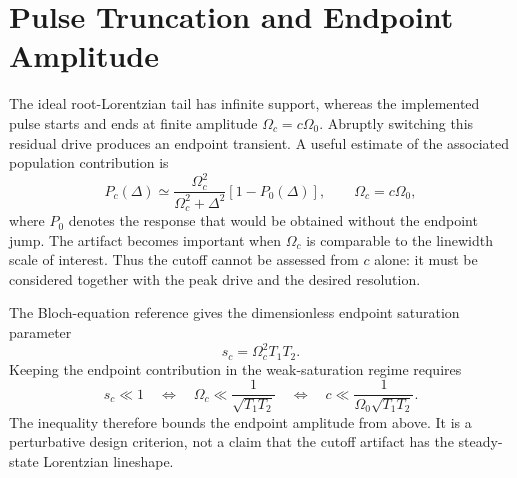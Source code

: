 \section{Pulse Truncation and Endpoint Amplitude}
\label{sec:pulse-cutoff}

The ideal root-Lorentzian tail has infinite support, whereas the implemented pulse
starts and ends at finite amplitude $\Omega_c=c\Omega_0$.  Abruptly switching
this residual drive produces an endpoint transient.  A useful estimate of the
associated population contribution is~\cite{mihov_defying_2024}
\begin{equation}
    P_c(\Delta)
    \simeq
    \frac{\Omega_c^2}{\Omega_c^2+\Delta^2}
    \left[1-P_0(\Delta)\right],
    \qquad \Omega_c=c\Omega_0,
    \label{eq:cutoff-artifact}
\end{equation}
where $P_0$ denotes the response that would be obtained without the endpoint
jump.  The artifact becomes important when $\Omega_c$ is comparable to the
linewidth scale of interest.  Thus the cutoff cannot be assessed from $c$
alone: it must be considered together with the peak drive and the desired
resolution.

The Bloch-equation reference gives the dimensionless endpoint saturation
parameter
\begin{equation}
    s_c=\Omega_c^2T_1T_2.
    \label{eq:cutoff-saturation}
\end{equation}
Keeping the endpoint contribution in the weak-saturation regime requires
\begin{equation}
    s_c\ll1
    \quad\Longleftrightarrow\quad
    \Omega_c\ll\frac{1}{\sqrt{T_1T_2}}
    \quad\Longleftrightarrow\quad
    c\ll\frac{1}{\Omega_0\sqrt{T_1T_2}}.
    \label{eq:cutoff-inequality}
\end{equation}
The inequality therefore bounds the endpoint amplitude from above.  It is a
perturbative design criterion, not a claim that the cutoff artifact has the
steady-state Lorentzian lineshape.

